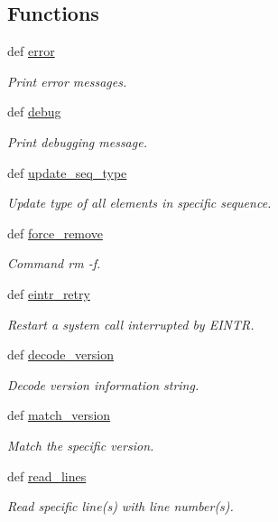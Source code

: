\subsection*{Functions}
\begin{DoxyCompactItemize}
\item 
def \hyperlink{namespaceadmin_ae1e80d1a965f6551fa95ff379ba2b0cd}{error}
\begin{DoxyCompactList}\small\item\em Print error messages. \end{DoxyCompactList}\item 
def \hyperlink{namespaceadmin_a575bcc44ebed9e68574ccb636a66a4d2}{debug}
\begin{DoxyCompactList}\small\item\em Print debugging message. \end{DoxyCompactList}\item 
def \hyperlink{namespaceadmin_ae1dbeff3e935d67ed99b95eb814c9a11}{update\-\_\-seq\-\_\-type}
\begin{DoxyCompactList}\small\item\em Update type of all elements in specific sequence. \end{DoxyCompactList}\item 
def \hyperlink{namespaceadmin_a8b0cb2905f04979a2db7cf3bb181ad00}{force\-\_\-remove}
\begin{DoxyCompactList}\small\item\em Command {\ttfamily rm -\/f}. \end{DoxyCompactList}\item 
def \hyperlink{namespaceadmin_a186685a5e2120c71362c46b35f0705c3}{eintr\-\_\-retry}
\begin{DoxyCompactList}\small\item\em Restart a system call interrupted by {\ttfamily E\-I\-N\-T\-R}. \end{DoxyCompactList}\item 
def \hyperlink{namespaceadmin_a2605170b60fdae0f26432f209ed71f49}{decode\-\_\-version}
\begin{DoxyCompactList}\small\item\em Decode version information string. \end{DoxyCompactList}\item 
def \hyperlink{namespaceadmin_a89c4e2a6cc63b64d27825da9eb414b98}{match\-\_\-version}
\begin{DoxyCompactList}\small\item\em Match the specific version. \end{DoxyCompactList}\item 
def \hyperlink{namespaceadmin_ae034627a9fca691b23ee55d255113a81}{read\-\_\-lines}
\begin{DoxyCompactList}\small\item\em Read specific line(s) with line number(s). \end{DoxyCompactList}\end{DoxyCompactItemize}
